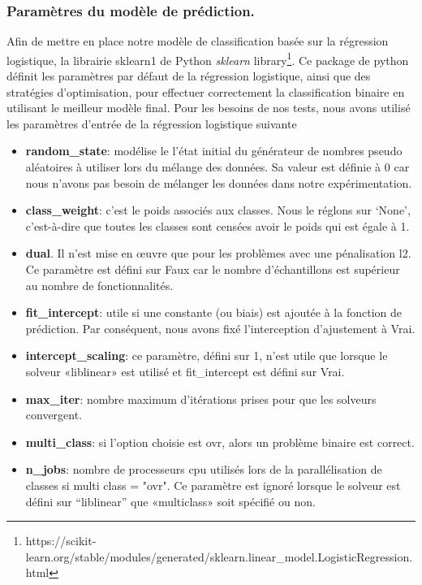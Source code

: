 \subsubsection{Paramètres du modèle de prédiction.}
 Afin de mettre en place notre modèle de classification basée sur la régression logistique, la librairie sklearn1 de Python \emph{sklearn} library\footnote{https://scikit-learn.org/stable/modules/generated/sklearn.linear\_model.LogisticRegression.html}. Ce package de python définit les paramètres par défaut de la régression logistique, ainsi que des stratégies d'optimisation, pour effectuer correctement la classification binaire en utilisant le meilleur modèle final. Pour les besoins de nos tests, nous avons utilisé les paramètres d'entrée de la régression logistique suivante
 \begin{itemize}
\item \textbf{random\_state}: modélise le l’état initial du générateur de nombres pseudo aléatoires à utiliser lors du mélange des données. Sa valeur est définie à 0 car nous n’avons pas besoin de mélanger les données dans notre expérimentation.
\item \textbf{class\_weight}: c’est le poids associés aux classes. Nous le réglons sur ‘None’, c'est-à-dire que toutes les classes sont censées avoir le poids qui est égale à 1.
\item \textbf{dual}. Il n’est mise en œuvre que pour les problèmes avec une pénalisation l2. Ce paramètre est défini sur Faux car le nombre d’échantillons est supérieur au nombre de fonctionnalités.
\item \textbf{fit\_intercept}: utile si une constante (ou biais) est ajoutée à la fonction de prédiction. Par conséquent, nous avons fixé l’interception d’ajustement à Vrai.
\item \textbf{intercept\_scaling}: ce paramètre, défini sur 1, n'est utile que lorsque le solveur «liblinear» est utilisé et fit_intercept est défini sur Vrai.
\item \textbf{max\_iter}: nombre maximum d'itérations prises pour que les solveurs convergent.
\item \textbf{multi\_class}: si l'option choisie est ovr, alors un problème binaire est correct.
\item \textbf{n\_jobs}: nombre de processeurs cpu utilisés lors de la parallélisation de classes si multi class = "ovr". Ce paramètre est ignoré lorsque le solveur est défini sur “liblinear” que «multiclass» soit spécifié ou non.


\end{itemize}
